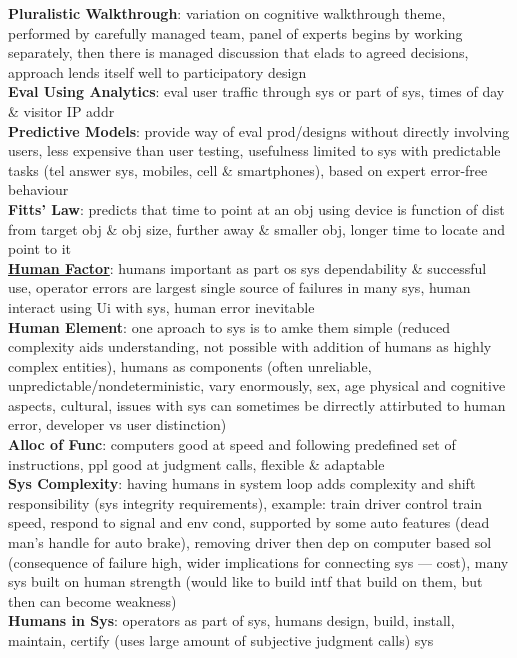 \documentclass[a4paper]{article}
\begin{document}
\begin{multicols}{3}
        \textbf{Pluralistic Walkthrough}: variation on cognitive walkthrough theme, performed by carefully managed team, panel of experts begins by working separately, then there is managed discussion that elads to agreed decisions, approach lends itself well to participatory design\\
        \textbf{Eval Using Analytics}: eval user traffic through sys or part of sys, times of day \& visitor IP addr\\
        \textbf{Predictive Models}: provide way of eval prod/designs without directly involving users, less expensive than user testing, usefulness limited to sys with predictable tasks (tel answer sys, mobiles, cell \& smartphones), based on expert error-free behaviour\\
        \textbf{Fitts' Law}: predicts that time to point at an obj using device is function of dist from target obj \& obj size, further away \& smaller obj, longer time to locate and point to it\\
        \underline{\textbf{Human Factor}}: humans important as part os sys dependability \& successful use, operator errors are largest single source of failures in many sys, human interact using Ui with sys, human error inevitable\\
        \textbf{Human Element}: one aproach to sys is to amke them simple (reduced complexity aids understanding, not possible with addition of humans as highly complex entities), humans as components (often unreliable, unpredictable/nondeterministic, vary enormously, sex, age physical and cognitive aspects, cultural, issues with sys can sometimes be dirrectly attirbuted to human error, developer vs user distinction)\\
        \textbf{Alloc of Func}: computers good at speed and following predefined set of instructions, ppl good at judgment calls, flexible \& adaptable\\
        \textbf{Sys Complexity}: having humans in system loop adds complexity and shift responsibility (sys integrity requirements), example: train driver control train speed, respond to signal and env cond, supported by some auto features (dead man's handle for auto brake), removing driver then dep on computer based sol (consequence of failure high, wider implications for connecting sys --- cost), many sys built on human strength (would like to build intf that build on them, but then can become weakness)\\
        \textbf{Humans in Sys}: operators as part of sys, humans design, build, install, maintain, certify (uses large amount of subjective judgment calls) sys\\

\end{multicols}
\end{document}
